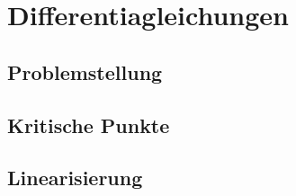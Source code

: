 %
%
%
\chapter{Differentiagleichungen\label{chapter:dgl}}

\section{Problemstellung}

\section{Kritische Punkte}

\section{Linearisierung}

